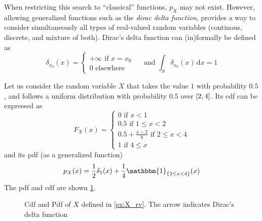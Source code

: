 \documentclass[../../Main_ManuscritThese.tex]{subfiles}
\newcommand\imgpath{/home/victor/acadwriting/Manuscrit/Text/Chapter2/img/}
\begin{document}
\begin{remark}
  When restricting this search to ``classical'' functions, $p_X$ may
  not exist. However, allowing generalized functions such as the
  \emph{dirac delta function}, provides a way to consider
  simultaneously all types of real-valued random variables (continous,
  discrete, and mixture of both). Dirac's delta function can
  (in)formally be defined as
  \begin{equation}
    \label{eq:def_dirac_delta}
    \delta_{x_0}(x) = 
    \begin{cases}
      +\infty \text{ if } x=x_0 \\
      0 \text{ elsewhere}
    \end{cases} \quad \text{ and }
    \int_S \delta_{x_0}(x)\,\mathrm{d}x = 1
  \end{equation}
\end{remark}
\begin{example}
  \label{ex:X_rv}
  Let us consider the random variable $X$ that takes the value $1$
  with probability $0.5$, and follows a uniform distribution with
  probability $0.5$ over $\interval{2}{4}$. Its cdf can be expressed as
  \begin{equation}
    F_X(x) =
    \begin{cases}
      0 \text{ if } x < 1 \\
      0.5 \text{ if } 1 \leq x < 2 \\
      0.5 + \frac{x-2}{8} \text{ if } 2 \leq x < 4 \\
      1 \text{ if } 4 \leq x
    \end{cases}
  \end{equation}
  and its pdf (as a generalized function)
  \begin{equation}
    p_X(x) = \frac{1}{2}\delta_{1}(x) + \frac{1}{4}\mathbbm{1}_{\{2\leq x < 4\}}(x) 
  \end{equation}
  The pdf and cdf are shown \cref{fig:example_pdf_cdf}.
\end{example}
\begin{figure}[!h]
  \centering
  
  \caption[Example of cdf and of pdf]{Cdf and Pdf of $X$ defined in \cref{ex:X_rv}. The arrow indicates Dirac's delta function}
  \label{fig:example_pdf_cdf}
\end{figure}
\end{document}
